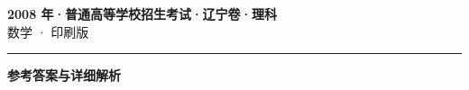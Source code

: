 \documentclass[zihao=5, a4paper]{ctexart}
\begin{document}
\begin{center}
  {\Large\bfseries 2008 年·普通高等学校招生考试·辽宁卷·理科}\\[4pt]
  {\large 数学 · 印刷版}
\end{center}
\medskip
{}

\par\bigskip\hrule\bigskip
{}
\begin{center}{\large\bfseries 参考答案与详细解析}\end{center}
\smallskip

\end{document}
